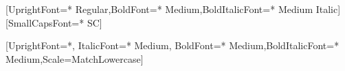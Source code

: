 \ifXeTeX
    \usepackage{fontspec}
    \setsansfont{Avenir Next}[UprightFont={* Regular},BoldFont={* Medium},BoldItalicFont={* Medium Italic}]
    \setmainfont{Alegreya}[SmallCapsFont={* SC}]
    
    \setmonofont{Fira Code}[UprightFont={*}, ItalicFont={* Medium}, BoldFont={* Medium},BoldItalicFont={* Medium},Scale=MatchLowercase]


\else
    \usepackage{fourier}
\fi
